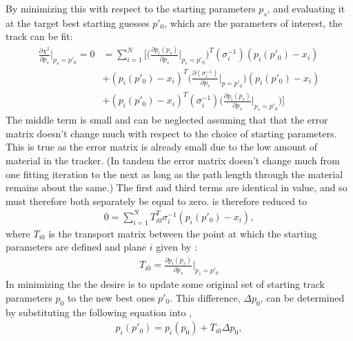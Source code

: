 By minimizing this \chisq with respect to the starting parameters $p_{s}$, and evaluating it at the target best starting guesses $p'_{0}$, which are the parameters of interest, the track can be fit:
    \begin{equation}
    \begin{aligned}
        \frac{\partial \chi^{2}}{\partial p_{s}}\Big|_{p_{s}=p'_{0}} = 0 
            &= \sum_{i=1}^{N}\Big[ \Big(\frac{\partial p_{i}(p_{s})}{\partial p_{s}}\Big|_{p_{s}=p'_{0}}\Big)^{T} (\sigma_{i}^{-1}) (p_{i}(p'_{0})-x_{i}) \\ 
            &+ (p_{i}(p'_{0})-x_{i})^{T} \Big(\frac{\partial(\sigma_{i}^{-1})}{\partial p_{s}}\Big|_{p=p'_{0}}\Big) (p_{i}(p'_{0})-x_{i}) \\ 
            &+  (p_{i}(p'_{0})-x_{i})^{T} (\sigma_{i}^{-1}) \Big(\frac{\partial p_{i}(p_{s})}{\partial p_{s}}\Big|_{p_{s}=p'_{0}}\Big)\Big]
    \label{eq:chi2summinimize}
    \end{aligned}
    \end{equation}
The middle term is small and can be neglected assuming that that the error matrix doesn't change much with respect to the choice of starting parameters. This is true as the error matrix is already small due to the low amount of material in the tracker. (In tandem the error matrix doesn't change much from one fitting iteration to the next as long as the path length through the material remains about the same.) The first and third terms are identical in value, and so must therefore both separately be equal to zero.  is therefore reduced to 
    \begin{align} \label{eq:chi2sumreduced}
        0 = \sum_{i=1}^{N} T^{T}_{i0} \sigma_{i}^{-1} (p_{i}(p'_{0})-x_{i}),
    \end{align}
where $T_{i0}$ is the transport matrix between the point at which the starting parameters are defined and plane $i$ given by :
    \begin{align} \label{eq:transportfrom0}
         T_{i0} = \frac{\partial p_{i}(p_{s})}{\partial p_{s}}\Big|_{p_{s}=p'_{0}}
    \end{align}
In minimizing the \chisq the desire is to update some original set of starting track parameters $p_{0}$ to the new best ones $p'_{0}$. This difference, $\Delta p_{0}$, can be determined by substituting the following equation into ,
    \begin{align} \label{eq:psub}
        p_{i}(p'_{0}) = p_{i}(p_{0}) + T_{i0} \Delta p_{0},
    \end{align}
